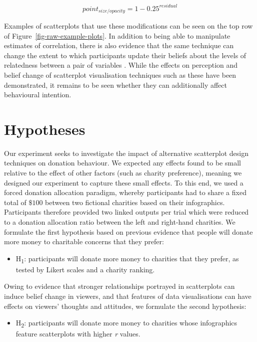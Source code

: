 \documentclass[
  authoryear,
  preprint,
  3p]{elsarticle}
\providecommand{\tightlist}{%
  \setlength{\itemsep}{0pt}\setlength{\parskip}{0pt}}
\begin{document}
\begin{equation}
  point_{size/opacity} = 1 - 0.25^{residual}
\end{equation}

Examples of scatterplots that use these modifications can be seen on the
top row of Figure~\ref{fig-raw-example-plots}. In addition to being able
to manipulate estimates of correlation, there is also evidence that the
same technique can change the extent to which participants update their
beliefs about the levels of relatedness between a pair of variables
\citep{strain_2025}. While the effects on perception and belief change
of scatterplot visualisation techniques such as these have been
demonstrated, it remains to be seen whether they can additionally affect
behavioural intention.

\section{Hypotheses}\label{sec-hypotheses}

Our experiment seeks to investigate the impact of alternative
scatterplot design techniques on donation behaviour. We expected any
effects found to be small relative to the effect of other factors (such
as charity preference), meaning we designed our experiment to capture
these small effects. To this end, we used a forced donation allocation
paradigm, whereby participants had to share a fixed total of \(\$100\)
between two fictional charities based on their infographics.
Participants therefore provided two linked outputs per trial which were
reduced to a donation allocation ratio between the left and right-hand
charities. We formulate the first hypothesis based on previous evidence
that people will donate more money to charitable concerns that they
prefer:

\begin{itemize}
\tightlist
\item
  H\textsubscript{1}: participants will donate more money to charities
  that they prefer, as tested by Likert scales and a charity ranking.
\end{itemize}

Owing to evidence that stronger relationships portrayed in scatterplots
can induce belief change in viewers, and that features of data
visualisations can have effects on viewers' thoughts and attitudes, we
formulate the second hypothesis:

\begin{itemize}
\tightlist
\item
  H\textsubscript{2}: participants will donate more money to charities
  whose infographics feature scatterplots with higher \emph{r} values.
\end{itemize}
\end{document}
